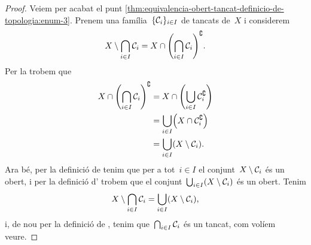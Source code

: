 \documentclass[../topologia.tex]{subfiles}
\begin{document}
\begin{proof}
        Veiem per acabat el punt \eqref{thm:equivalencia-obert-tancat-definicio-de-topologia:enum-3}.
        Prenem una família~\(\{\mathcal{C}_{i}\}_{i\in I}\) de tancats de~\(X\) i considerem
        \[
            X\setminus\bigcap_{i\in I}\tancat{C}_{i}=X\cap\left(\bigcap_{i\in I}\tancat{C}_{i}\right)^{\complement}.
        \]
        Per la  trobem que
        \begin{align*}
            X\cap\left(\bigcap_{i\in I}\tancat{C}_{i}\right)^{\complement}&=X\cap\left(\bigcup_{i\in I}\tancat{C}_{i}^{\complement}\right) \\
            &=\bigcup_{i\in I}\left(X\cap\tancat{C}_{i}^{\complement}\right) \\
            &=\bigcup_{i\in I}\left(X\setminus\tancat{C}_{i}\right).
        \end{align*}
        Ara bé, per la definició de  tenim que per a tot~\(i\in I\) el conjunt~\(X\setminus\mathcal{C}_{i}\) és un obert, i per la definició d' trobem que el conjunt~\(\bigcup_{i\in I}\left(X\setminus\tancat{C}_{i}\right)\) és un obert.
        Tenim
        \[
            X\setminus\bigcap_{i\in I}\tancat{C}_{i}=\bigcup_{i\in I}\left(X\setminus\tancat{C}_{i}\right),
        \]
        i, de nou per la definició de , tenim que~\(\bigcap_{i\in I}\mathcal{C}_{i}\) és un tancat, com volíem veure.
    \end{proof}
\end{document}
